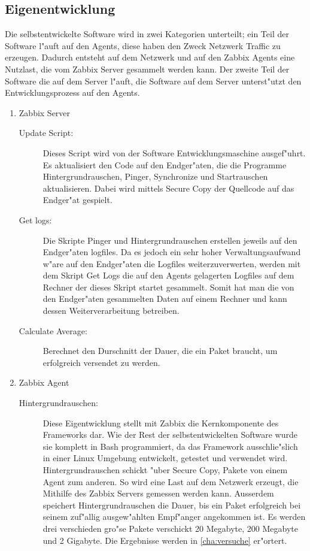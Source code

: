 \subsection{Eigenentwicklung}
Die selbstentwickelte Software wird in zwei Kategorien unterteilt; ein Teil der Software l"auft %
auf den Agents, diese haben den Zweck Netzwerk Traffic zu erzeugen. Dadurch entsteht auf dem Netzwerk und %
auf den Zabbix Agents eine Nutzlast, die vom Zabbix Server gesammelt werden kann. Der zweite Teil der Software %
die auf dem Server l"auft, die Software auf dem Server unterst"utzt den Entwicklungsprozess auf den Agents. %
\begin{enumerate}
\item Zabbix Server 
\begin{description}
\item[Update Script:]Dieses Script wird von der Software Entwicklungsmaschine ausgef"uhrt. Es aktualisiert den Code auf den Endger"aten, %
die die Programme Hintergrundrauschen, Pinger, Synchronize und Startrauschen aktualisieren. Dabei wird mittels Secure Copy %
der Quellcode auf das Endger"at gespielt.

\item[Get logs:]Die Skripte Pinger und Hintergrundrauschen erstellen jeweils auf den Endger"aten logfiles. %
Da es jedoch ein sehr hoher Verwaltungsaufwand w"are auf den Endger"aten die Logfiles weiterzuverwerten, %
werden mit dem Skript Get Logs die auf den Agents gelagerten Logfiles auf dem Rechner der dieses Skript %
startet gesammelt. Somit hat man die von den Endger"aten gesammelten Daten auf einem Rechner und kann %
dessen Weiterverarbeitung betreiben.      

\item[Calculate Average:]Berechnet den Durschnitt der Dauer, die ein Paket braucht, um erfolgreich versendet %
zu werden.
 
\end{description}

\item Zabbix Agent

\begin{description}
\item[Hintergrundrauschen:]Diese Eigentwicklung stellt mit Zabbix die Kernkomponente des Frameworks dar. Wie %
der Rest der selbstentwickelten Software wurde sie komplett in Bash programmiert, da das Framework ausschlie"slich %
in einer Linux Umgebung entwickelt, getestet und verwendet wird. Hintergrundrauschen schickt "uber Secure Copy, %
Pakete von einem Agent zum anderen. So wird eine %
Last auf dem Netzwerk erzeugt, die Mithilfe des Zabbix Servers gemessen werden kann. Ausserdem speichert Hintergrundrauschen %
die Dauer, bis ein Paket erfolgreich bei seinem zuf"allig ausgew"ahlten Empf"anger angekommen ist. %
Es werden drei verschieden gro"se Pakete verschickt 20 Megabyte, 200 Megabyte und 2 Gigabyte. %
Die Ergebnisse werden in \cref{cha:versuche} er"ortert.


\end{description}
\end{enumerate}
